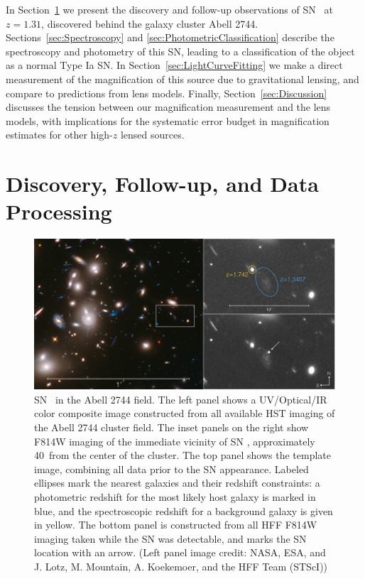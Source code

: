 In Section~\ref{sec:DiscoveryAndFollowup} we present the discovery and
follow-up observations of SN \tomas\ at $z=1.31$, discovered behind the
galaxy cluster Abell 2744.  Sections~\ref{sec:Spectroscopy}
and \ref{sec:PhotometricClassification} describe the spectroscopy and
photometry of this SN, leading to a classification of the object as a
normal Type Ia SN.  In Section~\ref{sec:LightCurveFitting} we make a
direct measurement of the magnification of this source due to
gravitational lensing, and compare to predictions from lens models.
Finally, Section~\ref{sec:Discussion} discusses the tension between
our magnification measurement and the lens models, with implications
for the systematic error budget in magnification estimates for other
high-$z$ lensed sources.


\section{Discovery, Follow-up, and Data Processing}
\label{sec:DiscoveryAndFollowup}

\begin{figure}
\begin{center}
\includegraphics[width=\textwidth]{FIG/discovery_image_lowres}
\caption{  \label{fig:DiscoveryImage} 
SN \tomas\ in the Abell 2744 field.  The left panel shows a
UV/Optical/IR color composite image constructed from all available HST
imaging of the Abell 2744 cluster field.  The inset panels on the right
show F814W imaging of the immediate vicinity of SN \tomas,
approximately 40\arcsec\ from the center of the cluster. The top panel
shows the template image, combining all data prior to the SN
appearance.  Labeled ellipses mark the nearest galaxies and their
redshift constraints: a photometric redshift for the most likely host
galaxy is marked in blue, and the spectroscopic redshift for a
background galaxy is given in yellow. The bottom panel is constructed
from all HFF F814W imaging taken while the SN was detectable, and
marks the SN location with an arrow.  (Left panel image credit: NASA,
ESA, and J. Lotz, M. Mountain, A. Koekemoer, and the HFF Team (STScI))
}
\end{center}
\end{figure}


